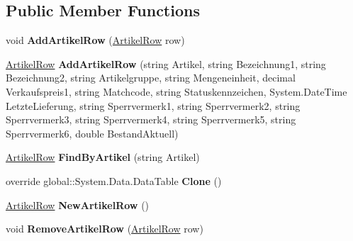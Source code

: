 \subsection*{Public Member Functions}
\begin{DoxyCompactItemize}
\item 
void {\bfseries Add\+Artikel\+Row} (\hyperlink{class_products_1_1_data_1_1ds_sage_1_1_artikel_row}{Artikel\+Row} row)\hypertarget{class_products_1_1_data_1_1ds_sage_1_1_artikel_data_table_a91559ddb84d5234deb5e4e9f48bfc2c2}{}\label{class_products_1_1_data_1_1ds_sage_1_1_artikel_data_table_a91559ddb84d5234deb5e4e9f48bfc2c2}

\item 
\hyperlink{class_products_1_1_data_1_1ds_sage_1_1_artikel_row}{Artikel\+Row} {\bfseries Add\+Artikel\+Row} (string Artikel, string Bezeichnung1, string Bezeichnung2, string Artikelgruppe, string Mengeneinheit, decimal Verkaufspreis1, string Matchcode, string Statuskennzeichen, System.\+Date\+Time Letzte\+Lieferung, string Sperrvermerk1, string Sperrvermerk2, string Sperrvermerk3, string Sperrvermerk4, string Sperrvermerk5, string Sperrvermerk6, double Bestand\+Aktuell)\hypertarget{class_products_1_1_data_1_1ds_sage_1_1_artikel_data_table_adbc1165d4d0322423b35212d61860423}{}\label{class_products_1_1_data_1_1ds_sage_1_1_artikel_data_table_adbc1165d4d0322423b35212d61860423}

\item 
\hyperlink{class_products_1_1_data_1_1ds_sage_1_1_artikel_row}{Artikel\+Row} {\bfseries Find\+By\+Artikel} (string Artikel)\hypertarget{class_products_1_1_data_1_1ds_sage_1_1_artikel_data_table_a394dc068553f8d18aab10be6dd340bd8}{}\label{class_products_1_1_data_1_1ds_sage_1_1_artikel_data_table_a394dc068553f8d18aab10be6dd340bd8}

\item 
override global\+::\+System.\+Data.\+Data\+Table {\bfseries Clone} ()\hypertarget{class_products_1_1_data_1_1ds_sage_1_1_artikel_data_table_a541c1b09cd1b151e879ea03edad5e8c5}{}\label{class_products_1_1_data_1_1ds_sage_1_1_artikel_data_table_a541c1b09cd1b151e879ea03edad5e8c5}

\item 
\hyperlink{class_products_1_1_data_1_1ds_sage_1_1_artikel_row}{Artikel\+Row} {\bfseries New\+Artikel\+Row} ()\hypertarget{class_products_1_1_data_1_1ds_sage_1_1_artikel_data_table_ac47957c5b66fbf59ef33310e93d42000}{}\label{class_products_1_1_data_1_1ds_sage_1_1_artikel_data_table_ac47957c5b66fbf59ef33310e93d42000}

\item 
void {\bfseries Remove\+Artikel\+Row} (\hyperlink{class_products_1_1_data_1_1ds_sage_1_1_artikel_row}{Artikel\+Row} row)\hypertarget{class_products_1_1_data_1_1ds_sage_1_1_artikel_data_table_a6deed19889377ffb9cdf29656bb036f8}{}\label{class_products_1_1_data_1_1ds_sage_1_1_artikel_data_table_a6deed19889377ffb9cdf29656bb036f8}

\end{DoxyCompactItemize}
